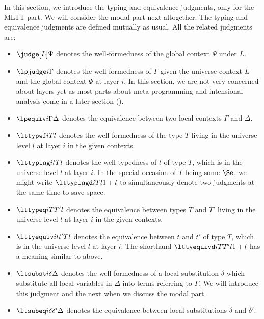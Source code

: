 In this section, we introduce the typing and equivalence judgments, only for the MLTT
part. %
We will consider the modal part next altogether. %
The typing and equivalence judgments are defined mutually as usual. %
All the related judgments are:
\begin{itemize}
\item $\judge[L]\Psi$ denotes the well-formedness of the global context $\Psi$ under
  $L$. 
\item $\lpjudge i \Gamma$ denotes the well-formedness of $\Gamma$ given the universe
  context $L$ and the global context $\Psi$ at layer $i$. %
  In this section, we are not very concerned about layers yet as most parts about
  meta-programming and intensional analysis come in a later section
  (). 
\item $\lpequiv i \Gamma\Delta$ denotes the equivalence between two local contexts
  $\Gamma$ and $\Delta$. 
\item $\lttypwf i T l$ denotes the well-formedness of the type $T$ living in the
  universe level $l$ at layer $i$ in the given contexts. 
\item $\lttyping i t T l$ denotes the well-typedness of $t$ of type $T$, which is in
  the universe level $l$ at layer $i$.
  In the special occasion of $T$ being some $\Se$, we might write $\lttypingd i T
  l{1 + l}$ to simultaneously denote two judgments at the same time to save space.
\item $\lttypeq i{T}{T'}l$ denotes the equivalence between types $T$ and $T'$ living in the
  universe level $l$ at layer $i$ in the given contexts. 
\item $\lttyequiv i t {t'} T l$ denotes the equivalence between $t$ and $t'$ of type
  $T$, which is in the universe level $l$ at layer $i$. %
  The shorthand $\lttyequivd i T {T'} l {1 + l}$ has a meaning similar to above.
\item $\ltsubst i \delta \Delta$ denotes the well-formedness of a local substitution
  $\delta$ which substitute all local variables in $\Delta$ into terms referring to
  $\Gamma$. %
  We will introduce this judgment and the next when we discuss the modal part. %
\item $\ltsubeq i\delta{\delta'}\Delta$ denotes the equivalence between local
  substitutions $\delta$ and $\delta'$. 
\end{itemize}


